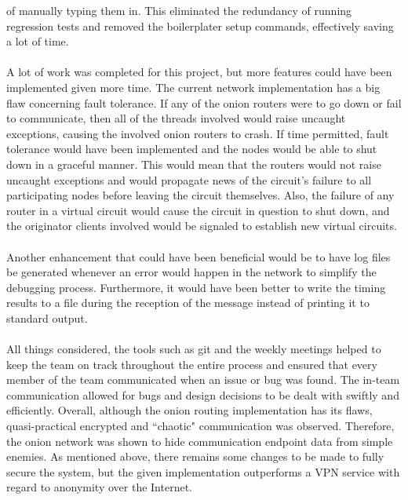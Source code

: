 \documentclass[10pt]{report}
\begin{document}
of manually typing them in. This eliminated the redundancy of running regression tests and removed
the boilerplater setup commands, effectively saving a lot of time.\\\\
A lot of work was completed for this project, but more features could have been implemented given
more time. The current network implementation has a big flaw concerning fault tolerance. If any of
the onion routers were to go down or fail to communicate, then all of the
threads involved would raise uncaught exceptions, causing the involved onion routers to crash. If
time permitted, fault tolerance would have been implemented and the nodes would be able to shut down
in a graceful manner.  This would mean that the routers would not raise uncaught exceptions and
would propagate news of the circuit's failure to all participating nodes before leaving the circuit
themselves. Also, the failure of any router in a virtual circuit would cause the circuit in question
to shut down, and the originator clients involved  would be signaled to establish new virtual
circuits. \\\\
Another enhancement that could have been beneficial would be to have log files be generated whenever
an error would happen in the network to simplify the debugging process. Furthermore, it would have
been better to write the timing results to a file during the reception of the message instead of
printing it to standard output. \\\\
All things considered, the tools such as git and the weekly meetings helped to keep the team on
track throughout the entire process and ensured that every member of the team communicated when an
issue or bug was found. The in-team communication allowed for bugs and design decisions to be dealt
with swiftly and efficiently. Overall, although the onion routing implementation has its flaws,
quasi-practical encrypted and ``chaotic" communication was observed. Therefore, the onion network
was shown to hide communication endpoint data from simple enemies. As mentioned above, there
remains some changes to be made to fully secure the system, but the given implementation outperforms
a VPN service with regard to anonymity over the Internet.
\end{document}
